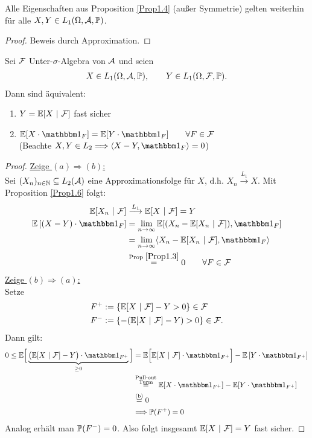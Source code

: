 \begin{korollar} %
Alle Eigenschaften aus Proposition \ref{Prop1.4} (außer Symmetrie) gelten weiterhin für alle $X,Y\in L_1(\Omega,\A,\P)$.
\end{korollar}
\begin{proof}
Beweis durch Approximation.
\end{proof}

\begin{theorem}%
Sei $\F$ Unter-$\sigma$-Algebra von $\A$ und seien
\begin{align*}
X\in L_1(\Omega,\A,\P),\qquad Y\in L_1(\Omega,\F,\P).
\end{align*}
Dann sind äquivalent:
\begin{enumerate}[label=(\alph*)]
\item $Y=\E[X~|~\F]$ fast sicher
\item $\E[X\cdot\indi_F]=\E[Y\cdot\indi_F]\qquad\forall F\in\F$\\
(Beachte $X,Y\in L_2\Longrightarrow\langle X-Y,\indi_F\rangle=0$)
\end{enumerate}
\end{theorem}
\begin{proof}
\underline{Zeige $(a)\Longrightarrow (b)$:}\\
Sei $(X_n)_{n\in\N}\subseteq L_2(\A)$ eine Approximationsfolge für $X$, d.h. $X_n\stackrel{L_1}{\longrightarrow} X$. Mit Proposition \ref{Prop1.6} folgt:
\begin{align*}
\E[X_n~|~\F]
&\stackrel{L_1}{\longrightarrow}
\E[X~|~\F]=Y\\
\E\left[(X-Y)\cdot\indi_F\right]
&=
\limn\E[(X_n-\E[X_n~|~\F]),\indi_F]\\
&=
\limn\langle X_n-\E[X_n~|~\F],\indi_F\rangle\\
&\stackrel{\text{Prop }\ref{Prop1.3}}{=}
0\qquad\forall F\in\F
\end{align*}
\underline{Zeige $(b)\Longrightarrow (a)$:}\\
Setze 
\begin{align*}
F^{+}&:=\left\lbrace\E[X~|~\F]-Y>0\right\rbrace\in\F\\
F^{-}&:=\left\lbrace-(\E[X~|~\F]-Y)>0\right\rbrace\in\F.
\end{align*}
Dann gilt:
\begin{align*}
0
\leq
\E\Big[\underbrace{\big(\E[X~|~\F]-Y\big)\cdot\indi_{F^+}}_{\geq0}\Big]
&=
\E\Big[\E[X~|~\F]\cdot\indi_{F^+}\Big]-\E\left[Y\cdot\indi_{F^+}\right]\\
&\stackeq{
\begin{subarray}{c}
	\text{Pull-out} \\ \text{Turm}
\end{subarray}
}
\E[X\cdot\indi_{F^+}]-\E[Y\cdot\indi_{F^+}]\\
&\stackeq{\text{(b)}}
0\\
&\Longrightarrow\P(F^+)=0
\end{align*}
Analog erhält man $\P(F^-)=0$. Also folgt insgesamt $\E[X~|~\F]=Y$ fast sicher.
\end{proof}

